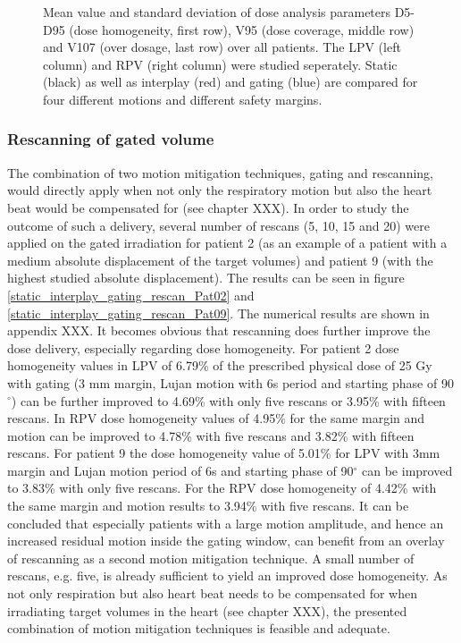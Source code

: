 \documentclass[type=dr, dr=rernat, accentcolor=tud7b,colorbacktitle, bigchapter, openright, twoside, 12pt ]{tudthesis}
\begin{document}
\begin{figure}[H]
{ }
\caption{Mean value and standard deviation of dose analysis parameters D5-D95 (dose homogeneity, first row), V95 (dose coverage, middle row) 
and V107 (over dosage, last row) over all patients. The LPV (left column) and RPV (right column) were studied seperately. Static (black) as well as interplay (red) and gating (blue) 
are compared for four different motions and different safety margins.}
\label{static_interplay_gating}
\end{figure}


\newpage 

\subsubsection*{Rescanning of gated volume}
\label{RescanofGate}


The combination of two motion mitigation techniques, gating and rescanning, would directly apply when not only the respiratory motion but 
also the heart beat would be compensated for (see chapter XXX). In order to study the outcome of such a delivery, several number of rescans 
(5, 10, 15 and 20) were applied on the gated irradiation for patient 2 (as an example of a patient with a medium absolute displacement of the 
target volumes) and patient 9 (with the highest studied absolute displacement). The results can be seen in figure 
\ref{static_interplay_gating_rescan_Pat02} and \ref{static_interplay_gating_rescan_Pat09}. The numerical results are shown in appendix XXX.\newline
\newline
It becomes obvious that rescanning does further improve the dose delivery, especially regarding dose homogeneity. For patient 2 
dose homogeneity values in LPV of 6.79\% of the prescribed physical dose of 25 Gy with gating (3 mm margin, Lujan motion with 6s period and starting 
phase of 90$^{\circ}$) can be further improved to 4.69\% with only five rescans or 3.95\% with fifteen rescans. In RPV dose homogeneity values of 
4.95\% for the same margin and motion can be improved to 4.78\% with five rescans and 3.82\% with fifteen rescans. 
For patient 9 the dose homogeneity value of 5.01\% for LPV with 3mm margin and Lujan motion period of 6s and starting phase of 90$^{\circ}$ can 
be improved to 3.83\% with only five rescans. For the RPV dose homogeneity of 4.42\% with the same margin and motion results to 
3.94\% with five rescans.\newline
\newline
It can be concluded that especially patients with a large motion amplitude, and hence an increased residual motion inside the gating window, 
can benefit from an overlay of rescanning as a second motion mitigation technique. A small number of rescans, e.g. five, is already 
sufficient to yield an improved dose homogeneity. As not only respiration but also heart beat needs to be compensated for when irradiating 
target volumes in the heart (see chapter XXX), the presented combination of motion mitigation techniques is feasible and adequate. 
\end{document}
